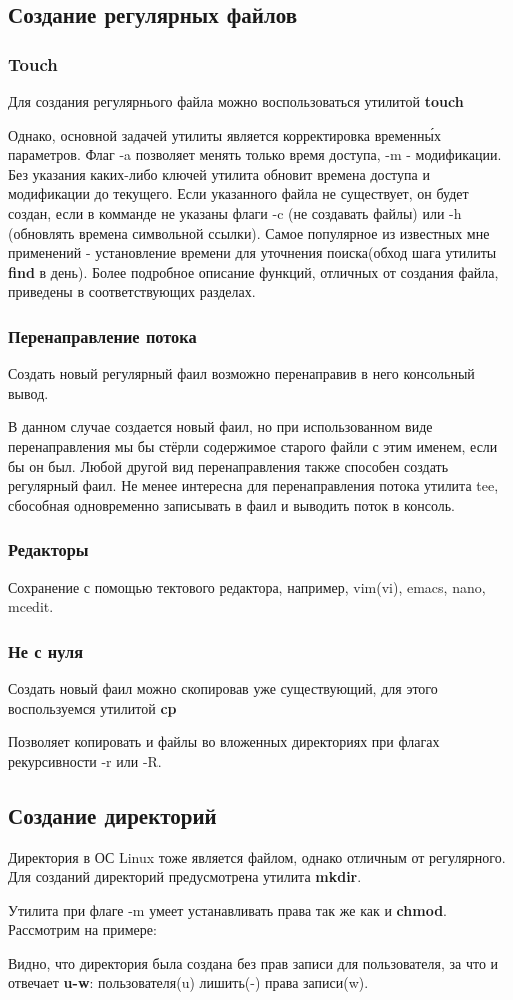 \documentclass[a4paper]{article}
\begin{document}
\subsection{Создание регулярных файлов}
\subsubsection{Touch}
Для создания регулярнього файла можно воспользоваться утилитой \textbf{touch}

Однако, основной задачей утилиты является корректировка временн\'{ы}х параметров. Флаг -a позволяет менять только время доступа, -m - модификации. Без указания каких-либо ключей утилита обновит времена доступа и модификации до текущего.
Если указанного файла не существует, он будет создан, если в комманде не указаны флаги -c (не создавать файлы) или -h (обновлять времена символьной ссылки).
Самое популярное из известных мне применений - установление времени для уточнения поиска(обход шага утилиты \textbf{find} в день). Более подробное описание функций, отличных от создания файла, приведены в соответствующих разделах.
\subsubsection{Перенаправление потока}
Создать новый регулярный фаил возможно перенаправив в него консольный вывод.

В данном случае создается новый фаил, но при использованном виде перенаправления мы бы стёрли содержимое старого файли с этим именем, если бы он был. Любой другой вид перенаправления также способен создать регулярный фаил. Не менее интересна для перенаправления потока утилита tee, сбособная одновременно записывать в фаил и выводить поток в консоль.
\subsubsection{ Редакторы}
Сохранение с помощью тектового редактора, например, vim(vi), emacs, nano, mcedit.
\subsubsection{ Не с нуля}
\label{subsec:not_null}
Создать новый фаил можно скопировав уже существующий, для этого воспользуемся утилитой \textbf{cp}

Позволяет копировать и файлы во вложенных директориях при флагах рекурсивности -r или -R.
\subsection{Создание директорий}
Директория в ОС Linux тоже является файлом, однако отличным от регулярного.
Для созданий директорий предусмотрена утилита \textbf{mkdir}.

Утилита при флаге -m умеет устанавливать права так же как и \textbf{chmod}. Рассмотрим на примере:

Видно, что директория была создана без прав записи для пользователя, за что и отвечает \textbf{u-w}: пользователя(u) лишить(-) права записи(w). 
\end{document}
